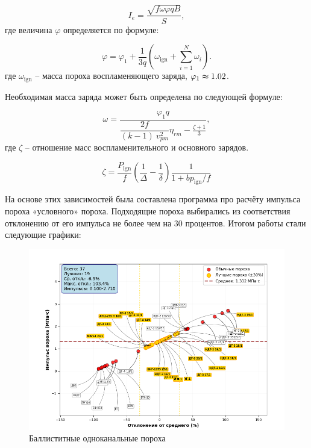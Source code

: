 \documentclass[14pt, a4paper]{extreport} %
\begin{document}
\begin{equation}
I_e = \frac{\sqrt{f \omega \varphi q B}}{S},
\end{equation}
где величина $\varphi$ определяется по формуле:

\begin{equation}
\varphi = \varphi_1 + \frac{1}{3q} \left( \omega_{\text{ign}} + \sum_{i=1}^{N} \omega_i \right).
\end{equation}
где $\omega_\text{ign}$ -- масса пороха воспламеняющего заряда, $\varphi_1 \thickapprox  1.02$.

Необходимая масса заряда может быть определена по следующей формуле: 

\begin{equation}
    \omega = \frac{\varphi_1 q}{\dfrac{2f}{(k-1)\ v^2_{pm}} \eta_{rm} - \frac{\zeta + 1}{3}},
\end{equation}
где $\zeta$ -- отношение масс воспламенительного и основного зарядов.

\begin{equation}
\zeta = \frac{P_{\mathrm{ign}}}{f} \left( \frac{1}{\Delta} - \frac{1}{\delta} \right) \frac{1}{1 + b p_{\mathrm{ign}} / f}
\end{equation}

На основе этих зависимостей была составлена программа про расчёту импульса пороха «условного»
пороха. Подходящие пороха выбирались из соответствия отклонению от его импульса не более чем на 30 процентов. Итогом работы стали следующие графики: 

\begin{figure}[H]
\centering
\includegraphics[width=0.65\textheight]{imgs/kaif.png}
\caption{Баллиститные одноканальные пороха}
\end{figure}
\end{document}

